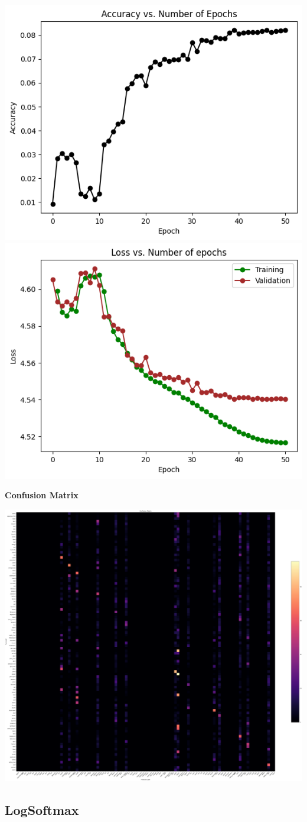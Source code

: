 \documentclass{article}
\begin{document}
\includegraphics[width=0.5\linewidth]{images/Softmax/accvsloss.png}
\includegraphics[width=0.5\linewidth]{images/Softmax/lossvsepochs.png}
\vspace{6pt}


\textbf{Confusion Matrix}

\includegraphics[width=0.9\linewidth]{images/Softmax/highres-softmax-resnet12.png}


\subsection{LogSoftmax}
\end{document}
